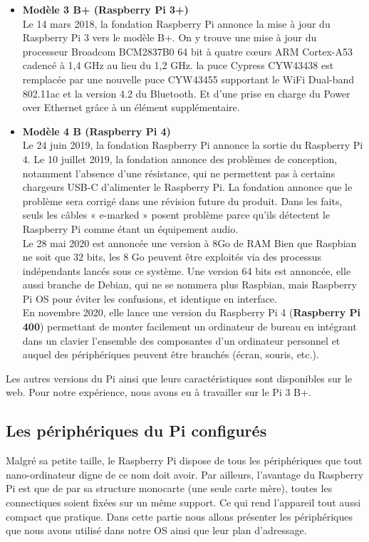 \documentclass[12pt,a4paper,oneside]{book}
\begin{document}
\begin{itemize}
		\item \textbf{Modèle 3 B+ (Raspberry Pi 3+)}\\
		Le 14 mars 2018, la fondation Raspberry Pi annonce la mise à jour du Raspberry Pi 3 vers le modèle B+. On y trouve une mise à jour du processeur Broadcom BCM2837B0 64 bit à quatre cœurs ARM Cortex-A53 cadencé à 1,4 GHz au lieu du 1,2 GHz. la puce Cypress CYW43438 est remplacée par une nouvelle puce CYW43455 supportant le WiFi Dual-band 802.11ac et la version 4.2 du Bluetooth. Et d'une prise en charge du Power over Ethernet grâce à un élément supplémentaire.\\
		
		\item \textbf{Modèle 4 B (Raspberry Pi 4)}\\
		Le 24 juin 2019, la fondation Raspberry Pi annonce la sortie du Raspberry Pi 4. Le 10 juillet 2019, la fondation annonce des problèmes de conception, notamment l'absence d'une résistance, qui ne permettent pas à certains chargeurs USB-C d’alimenter le Raspberry Pi. La fondation annonce que le problème sera corrigé dans une révision future du produit. Dans les faits, seuls les câbles « e-marked » posent problème parce qu'ils détectent le Raspberry Pi comme étant un équipement audio.\\
		Le 28 mai 2020 est annoncée une version à 8Go de RAM Bien que Raspbian ne soit que 32 bits, les 8 Go peuvent être exploités via des processus indépendants lancés sous ce système. Une version 64 bits est annoncée, elle aussi branche de Debian, qui ne se nommera plus Raspbian, mais Raspberry Pi OS pour éviter les confusions, et identique en interface.\\
		En novembre 2020, elle lance une version du Raspberry Pi 4 (\textbf{Raspberry Pi 400}) permettant de monter facilement un ordinateur de bureau en intégrant dans un clavier l'ensemble des composantes d'un ordinateur personnel et auquel des périphériques peuvent être branchés (écran, souris, etc.).\\
	\end{itemize}
	Les autres versions du Pi ainsi que leurs caractéristiques sont disponibles sur le web. Pour notre expérience, nous avons eu à travailler sur le Pi 3 B+.
	
	
	\subsection{Les périphériques du Pi configurés}
	Malgré sa petite taille, le Raspberry Pi dispose de tous les périphériques que tout nano-ordinateur digne de ce nom doit avoir. Par ailleurs, l’avantage du Raspberry Pi est que de par sa structure monocarte (une seule carte mère), toutes les connectiques soient fixées sur un même support. Ce qui rend l’appareil tout aussi compact que pratique. Dans cette partie nous allons présenter les périphériques que nous avons utilisé dans notre OS ainsi que leur plan d'adressage.
\end{document}
